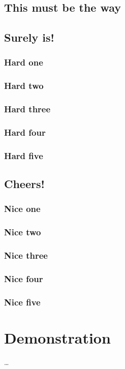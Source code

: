 \documentclass[%
        TwoSidePages,%
        Portuguese,%
        FinalVersion,%
        TablesPage,%
        FiguresPage,%
        ]%
{ic-tese-v2}
\begin{document}
\section{This must be the way}

\section{Surely is!}

\subsection{Hard one}

\subsection{Hard two}

\subsection{Hard three}

\subsection{Hard four}

\subsection{Hard five}

\section{Cheers!}

\subsection{Nice one}

\subsection{Nice two}

\subsection{Nice three}

\subsection{Nice four}

\subsection{Nice five}



\appendix
\chapter{Demonstration}
\ldots
\end{document}
